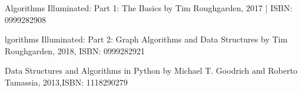 
Algorithms Illuminated: Part 1: The Basics
by Tim Roughgarden, 2017 | ISBN: 0999282908


lgorithms Illuminated: Part 2: Graph Algorithms and Data Structures
by Tim Roughgarden, 2018, ISBN: 0999282921



Data Structures and Algorithms in Python
by Michael T. Goodrich and Roberto Tamassia, 2013,ISBN: 1118290279
